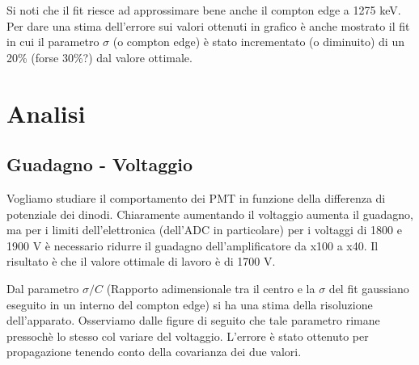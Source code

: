 \documentclass[a4paper,11pt,italian]{report}
\begin{document}
Si noti che il fit riesce ad approssimare bene anche il compton edge a 1275 keV. Per dare una stima dell'errore sui valori ottenuti in grafico è anche mostrato il fit in cui il parametro $\sigma$ (o compton edge) è stato incrementato (o diminuito) di un 20\% (forse 30\%?) dal valore ottimale.
\section*{Analisi}

\subsection*{Guadagno - Voltaggio}

Vogliamo studiare il comportamento dei PMT in funzione della differenza di potenziale dei dinodi. Chiaramente aumentando il voltaggio aumenta il guadagno, ma per i limiti dell'elettronica (dell'ADC in particolare) per i voltaggi di 1800 e 1900 V è necessario ridurre il guadagno dell'amplificatore da x100 a x40. Il risultato è che il valore ottimale di lavoro è di 1700 V. 

Dal parametro $\sigma/C$ (Rapporto adimensionale tra il centro e la $\sigma$ del fit gaussiano eseguito in un interno del compton edge) si ha una stima della risoluzione dell'apparato. Osserviamo dalle figure di seguito che tale parametro rimane pressochè lo stesso col variare del voltaggio.
L'errore è stato ottenuto per propagazione tenendo conto della covarianza dei due valori.
\end{document}
